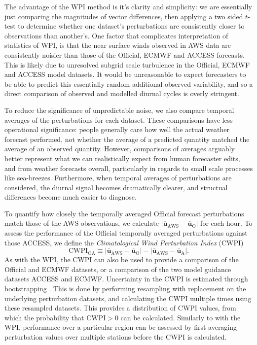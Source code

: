 \documentclass[alpha-refs]{wiley-article}
\begin{document}
The advantage of the WPI method is it's clarity and simplicity: we are essentially just comparing the magnitudes of vector differences, then applying a two sided $t$-test to determine whether one dataset's perturbations are consistently closer to observations than another's. One factor that complicates interpretation of statistics of WPI, is that the near surface winds observed in AWS data are consistently noisier than those of the Official, ECMWF and ACCESS forecasts. This is likely due to unresolved subgrid scale turbulence in the Official, ECMWF and ACCESS model datasets. It would be unreasonable to expect forecasters to be able to predict this essentially random additional observed variability, and so a direct comparison of observed and modelled diurnal cycles is overly stringent. 

To reduce the significance of unpredictable noise, we also compare temporal averages of the perturbations for each dataset. These comparisons have less operational significance: people generally care how well the actual weather forecast performed, not whether the average of a predicted quantity matched the average of an observed quantity. However, comparisons of averages arguably better represent what we can realistically expect from human forecaster edits, and from weather forecasts overall, particularly in regards to small scale processes like sea-breezes. Furthermore, when temporal averages of perturbations are considered, the diurnal signal becomes dramatically clearer, and structual differences become much easier to diagnose. 

To quantify how closely the temporally averaged Official forecast perturbations match those of the AWS observations, we calculate 
$\left\lvert \overline{\boldsymbol{u}}_{\text{AWS}} - \overline{\boldsymbol{u}}_{\text{O}} \right\rvert$ for each hour. To assess the performance of the Official temporally averaged perturbations against those ACCESS, we define the \textit{Climatological Wind Perturbation Index} (CWPI)
\begin{equation}
\text{CWPI}_{\text{OA}} \equiv \left\lvert \overline{\boldsymbol{u}}_{\text{AWS}}-\overline{\boldsymbol{u}}_{\text{O}} \right\rvert - \left\lvert \overline{\boldsymbol{u}}_{\text{AWS}}-\overline{\boldsymbol{u}}_{\text{A}} \right\rvert.
\end{equation}
As with the WPI, the CWPI can also be used to provide a comparison of the Official and ECMWF datasets, or a comparison of the two model guidance datasets ACCESS and ECMWF. Uncertainty in the CWPI is estimated through bootstrapping \citep{efron79}. This is done by performing resampling with replacement on the underlying perturbation datasets, and calculating the CWPI multiple times using these resampled datasets. This provides a distribution of CWPI values, from which the probability that $\text{CWPI} > 0$ can be calculated. Similarly to with the WPI, performance over a particular region can be assessed by first averaging perturbation values over multiple stations before the CWPI is calculated.
\end{document}

